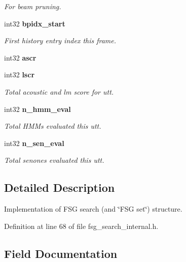 \begin{DoxyCompactItemize}
\begin{DoxyCompactList}\small\item\em For beam pruning. \end{DoxyCompactList}\item 
int32 {\bf bpidx\-\_\-start}\label{structfsg__search__s_a24d59609008ac132dca256d36a89f9c8}

\begin{DoxyCompactList}\small\item\em First history entry index this frame. \end{DoxyCompactList}\item 
int32 {\bfseries ascr}\label{structfsg__search__s_aac3c130a5777edd2a227fd064eaefbf2}

\item 
int32 {\bf lscr}\label{structfsg__search__s_a709277a80e9418ecc3e63296f8eb6bbf}

\begin{DoxyCompactList}\small\item\em Total acoustic and lm score for utt. \end{DoxyCompactList}\item 
int32 {\bf n\-\_\-hmm\-\_\-eval}\label{structfsg__search__s_a7e3d7375b4a33af339e8b55885677faa}

\begin{DoxyCompactList}\small\item\em Total H\-M\-Ms evaluated this utt. \end{DoxyCompactList}\item 
int32 {\bf n\-\_\-sen\-\_\-eval}\label{structfsg__search__s_a56494e3b30d0c66367c7ef055b8addb2}

\begin{DoxyCompactList}\small\item\em Total senones evaluated this utt. \end{DoxyCompactList}\end{DoxyCompactItemize}


\subsection{Detailed Description}
Implementation of F\-S\-G search (and \char`\"{}\-F\-S\-G set\char`\"{}) structure. 

Definition at line 68 of file fsg\-\_\-search\-\_\-internal.\-h.



\subsection{Field Documentation}
